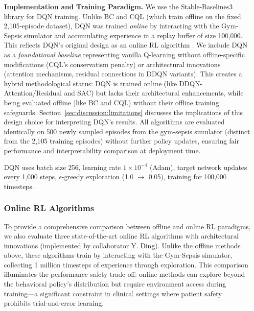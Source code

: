 \textbf{Implementation and Training Paradigm.} We use the Stable-Baselines3 library for DQN training. Unlike BC and CQL (which train offline on the fixed 2,105-episode dataset), DQN was trained \textit{online} by interacting with the Gym-Sepsis simulator and accumulating experience in a replay buffer of size 100,000. This reflects DQN's original design as an online RL algorithm \citep{mnih2015dqn}. We include DQN as a \textit{foundational baseline} representing vanilla Q-learning without offline-specific modifications (CQL's conservatism penalty) or architectural innovations (attention mechanisms, residual connections in DDQN variants). This creates a hybrid methodological status: DQN is trained online (like DDQN-Attention/Residual and SAC) but lacks their architectural enhancements, while being evaluated offline (like BC and CQL) without their offline training safeguards. Section~\ref{sec:discussion:limitations} discusses the implications of this design choice for interpreting DQN's results. All algorithms are evaluated identically on 500 newly sampled episodes from the gym-sepsis simulator (distinct from the 2,105 training episodes) without further policy updates, ensuring fair performance and interpretability comparison at deployment time.

DQN uses batch size 256, learning rate $1 \times 10^{-4}$ (Adam), target network updates every 1,000 steps, $\epsilon$-greedy exploration (1.0 $\to$ 0.05), training for 100,000 timesteps.

\subsubsection{Online RL Algorithms}\label{sec:methods:algos:online}

To provide a comprehensive comparison between offline and online RL paradigms, we also evaluate three state-of-the-art online RL algorithms with architectural innovations (implemented by collaborator Y. Ding). Unlike the offline methods above, these algorithms train by interacting with the Gym-Sepsis simulator, collecting 1 million timesteps of experience through exploration. This comparison illuminates the performance-safety trade-off: online methods can explore beyond the behavioral policy's distribution but require environment access during training—a significant constraint in clinical settings where patient safety prohibits trial-and-error learning.

